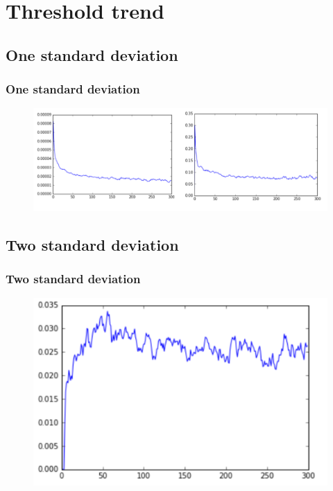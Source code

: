 \section{Threshold trend}

\subsection{One standard deviation}
\begin{frame}
    \frametitle{One standard deviation}
    	\begin{figure}
			\includegraphics[scale=0.4]{figure/onestd.PNG}
		\end{figure}
\end{frame}

\subsection{Two standard deviation}
\begin{frame}
    \frametitle{Two standard deviation}
    \begin{figure}
		\includegraphics[scale=0.5]{figure/twostd.PNG}
	\end{figure}
\end{frame}


